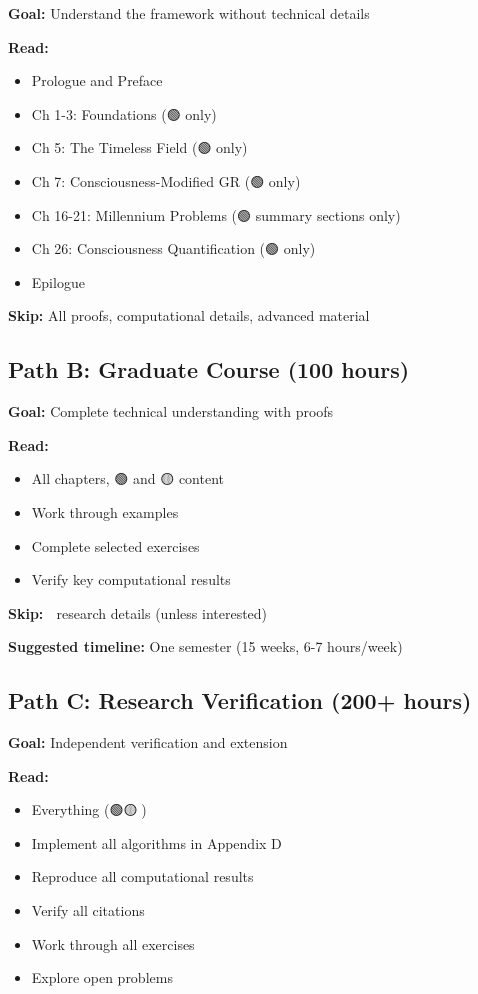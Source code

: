 \textbf{Goal:} Understand the framework without technical details

\textbf{Read:} 
\begin{itemize}
\item Prologue and Preface
\item Ch 1-3: Foundations (🟢 only)
\item Ch 5: The Timeless Field (🟢 only)
\item Ch 7: Consciousness-Modified GR (🟢 only)
\item Ch 16-21: Millennium Problems (🟢 summary sections only)
\item Ch 26: Consciousness Quantification (🟢 only)
\item Epilogue
\end{itemize}

\textbf{Skip:} All proofs, computational details, advanced material

\subsection*{Path B: Graduate Course (100 hours)}

\textbf{Goal:} Complete technical understanding with proofs

\textbf{Read:}
\begin{itemize}
\item All chapters, 🟢 and 🟡 content
\item Work through examples
\item Complete selected exercises
\item Verify key computational results
\end{itemize}

\textbf{Skip:} 🔴 research details (unless interested)

\textbf{Suggested timeline:} One semester (15 weeks, 6-7 hours/week)

\subsection*{Path C: Research Verification (200+ hours)}

\textbf{Goal:} Independent verification and extension

\textbf{Read:}
\begin{itemize}
\item Everything (🟢🟡🔴)
\item Implement all algorithms in Appendix D
\item Reproduce all computational results
\item Verify all citations
\item Work through all exercises
\item Explore open problems
\end{itemize}

